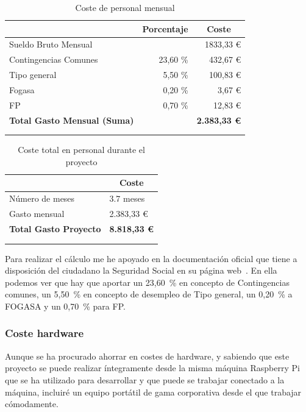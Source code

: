 \begin{longtable}[c]{@{}lrr@{}}
\toprule
\centering
\multicolumn{1}{c}{\textbf{Concepto}} & \multicolumn{1}{c}{\textbf{Porcentaje}} & \multicolumn{1}{c}{\textbf{Coste}} \\* \midrule
\endfirsthead
%
\endhead
%
\bottomrule
\endfoot
%
\endlastfoot
%
Sueldo Bruto Mensual &  & 1833,33 € \\
Contingencias Comunes & 23,60 \% & 432,67 € \\
Tipo general & 5,50 \% & 100,83 € \\
Fogasa & 0,20 \% & 3,67 € \\
FP & 0,70 \% & 12,83 € \\ \hline
\textbf{Total Gasto Mensual (Suma)} & & \textbf{2.383,33 €} \\* \bottomrule \\
\caption{Coste de personal mensual}
\label{tab:CostePersonal}
\end{longtable}


\begin{longtable}[c]{@{}ll@{}}
\toprule
\centering
\multicolumn{1}{c}{\textbf{Concepto}} & \multicolumn{1}{c}{\textbf{Coste}} \\* \midrule
\endfirsthead
%
\endhead
%
\bottomrule
\endfoot
%
\endlastfoot
%
Número de meses & 3.7 meses \\
Gasto mensual & 2.383,33 € \\ \hline
\textbf{Total Gasto Proyecto} & \textbf{8.818,33 €} \\* \bottomrule \\
\caption{Coste total en personal durante el proyecto}
\label{tab:CostePersonalTotal}\\
\end{longtable}


Para realizar el cálculo me he apoyado en la documentación oficial que tiene a disposición del ciudadano la Seguridad Social en su página web~\cite{manual:SS}. En ella podemos ver que hay que aportar un 23,60~\% en concepto de Contingencias comunes, un 5,50~\% en concepto de desempleo de Tipo general, un 0,20~\% a FOGASA y un 0,70~\% para FP.



\subsubsection{Coste hardware}
Aunque se ha procurado ahorrar en costes de hardware, y sabiendo que este proyecto se puede realizar íntegramente desde la misma máquina Raspberry Pi que se ha utilizado para desarrollar y que puede se trabajar conectado a la máquina, incluiré un equipo portátil de gama corporativa desde el que trabajar cómodamente.


